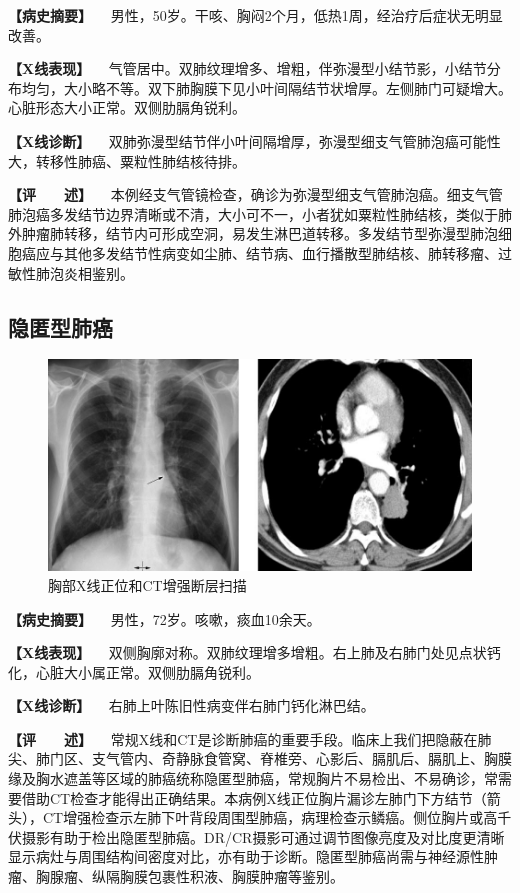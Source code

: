\textbf{【病史摘要】}
　男性，50岁。干咳、胸闷2个月，低热1周，经治疗后症状无明显改善。

\textbf{【X线表现】}
　气管居中。双肺纹理增多、增粗，伴弥漫型小结节影，小结节分布均匀，大小略不等。双下肺胸膜下见小叶间隔结节状增厚。左侧肺门可疑增大。心脏形态大小正常。双侧肋膈角锐利。

\textbf{【X线诊断】}
　双肺弥漫型结节伴小叶间隔增厚，弥漫型细支气管肺泡癌可能性大，转移性肺癌、粟粒性肺结核待排。

\textbf{【评　　述】}
　本例经支气管镜检查，确诊为弥漫型细支气管肺泡癌。细支气管肺泡癌多发结节边界清晰或不清，大小可不一，小者犹如粟粒性肺结核，类似于肺外肿瘤肺转移，结节内可形成空洞，易发生淋巴道转移。多发结节型弥漫型肺泡细胞癌应与其他多发结节性病变如尘肺、结节病、血行播散型肺结核、肺转移瘤、过敏性肺泡炎相鉴别。

\subsection{隐匿型肺癌}

\begin{figure}[!htbp]
 \centering
 \includegraphics{./images/Image00171.jpg}
 \captionsetup{justification=centering}
 \caption{胸部X线正位和CT增强断层扫描}
 \label{fig3-8-9}
  \end{figure} 

\textbf{【病史摘要】} 　男性，72岁。咳嗽，痰血10余天。

\textbf{【X线表现】}
　双侧胸廓对称。双肺纹理增多增粗。右上肺及右肺门处见点状钙化，心脏大小属正常。双侧肋膈角锐利。

\textbf{【X线诊断】} 　右肺上叶陈旧性病变伴右肺门钙化淋巴结。

\textbf{【评　　述】}
　常规X线和CT是诊断肺癌的重要手段。临床上我们把隐蔽在肺尖、肺门区、支气管内、奇静脉食管窝、脊椎旁、心影后、膈肌后、膈肌上、胸膜缘及胸水遮盖等区域的肺癌统称隐匿型肺癌，常规胸片不易检出、不易确诊，常需要借助CT检查才能得出正确结果。本病例X线正位胸片漏诊左肺门下方结节（箭头），CT增强检查示左肺下叶背段周围型肺癌，病理检查示鳞癌。侧位胸片或高千伏摄影有助于检出隐匿型肺癌。DR/CR摄影可通过调节图像亮度及对比度更清晰显示病灶与周围结构间密度对比，亦有助于诊断。隐匿型肺癌尚需与神经源性肿瘤、胸腺瘤、纵隔胸膜包裹性积液、胸膜肿瘤等鉴别。

